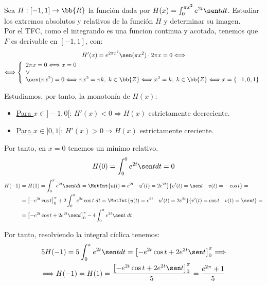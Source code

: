 \begin{ejercicio}
    Sea $H:[-1, 1]\to \bb{R}$ la función dada por $H(x) = \int_0^{\pi x^2} e^{2t}\sen t dt$. Estudiar los extremos absolutos y relativos de la función $H$ y determinar su imagen.\\

    Por el TFC, como el integrando es una funcion continua y acotada, tenemos que $F$ es derivable en $[-1,1]$, con:
    \begin{multline*}
        H'(x)=e^{2\pi x^2}\sen(\pi x^2)\cdot 2\pi x = 0 \Longleftrightarrow \\ \Longleftrightarrow \left\{\begin{array}{l}
            2\pi x = 0 \Longleftrightarrow x=0 \\
            \lor \\
            \sen(\pi x^2)=0 \Longleftrightarrow \pi x^2 =\pi k,\;k\in \bb{Z} \Longleftrightarrow x^2=k,\;k\in \bb{Z} \Longleftrightarrow x=\{-1,0,1\}
        \end{array}\right.
    \end{multline*}

    Estudiamos, por tanto, la monotonía de $H(x)$:
    \begin{itemize}
        \item \underline{Para $x\in ]-1, 0[$}: $H'(x)<0\Longrightarrow H(x)$ estrictamente decreciente.
        \item \underline{Para $x\in ]0,1[$}: $H'(x)>0\Longrightarrow H(x)$ estrictamente creciente.
    \end{itemize}

    Por tanto, en $x=0$ tenemos un mínimo relativo.
    \begin{equation*}
        H(0)=\int_0^0 e^{2t}\sen t dt = 0
    \end{equation*}
    \begin{equation*}\begin{split}
        H(-1)&=H(1)=\int_0^{\pi} e^{2t}\sen t dt = \MetInt{u(t)=e^{2t} \quad u'(t)=2e^{2t}}{v'(t)=\sen t \quad v(t)=-\cos t} 
        =\\&= \left[-e^{2t}\cos t\right]_0^\pi +2\int_0^\pi e^{2t}\cos t\;dt = \MetInt{u(t)=e^{2t} \quad u'(t)=2e^{2t}}{v'(t)=\cos t \quad v(t)=\sen t} 
        =\\&= \left[-e^{2t}\cos t +2e^{2t}\sen t\right]_0^\pi -4\int_0^\pi e^{2t}\sen t\;dt
    \end{split}\end{equation*}

    Por tanto, resolviendo la integral cíclica tenemos:
    \begin{multline*}
        5H(-1) = 5\int_0^{\pi} e^{2t}\sen t dt = \left[-e^{2t}\cos t +2e^{2t}\sen t\right]_0^\pi 
        \Longrightarrow \\ \Longrightarrow H(-1)=H(1) = \frac{\left[-e^{2t}\cos t +2e^{2t}\sen t\right]_0^\pi}{5} = \frac{e^{2\pi} +1}{5}
    \end{multline*}


\end{ejercicio}
